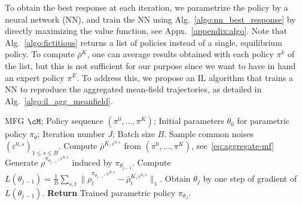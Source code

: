 \documentclass{article}
\theoremstyle{plain}
\begin{document}
To obtain the best response at each iteration, we parametrize the policy by a neural network (NN), and train the NN using Alg.~\ref{algo:nn_best_response} 
by directly maximizing the value function, see Appx.~\ref{appendix:algo}. Note that Alg.~\ref{algo:fictitious} returns a list of policies instead of a single, equilibrium policy. To compute $\bar\rho^K$, one can average results obtained with each policy $\pi^k$ of the list, but this is not sufficient for our purpose since we want to have in hand an expert policy $\pi^E$. 
To address this, we propose an IL algorithm that trains a NN to reproduce the aggregated mean-field trajectories, as detailed in Alg.~\ref{algo:il_agg_meanfield}.
\begin{algorithm}[t]
\caption{Mean Field Imitation Learning (MF-IL)}
\begin{algorithmic}[1]
\label{algo:il_agg_meanfield}
\REQUIRE MFG $\cM$; Policy sequence $(\pi^0, \dots, \pi^K)$; 
Initial parameters $\theta_0$ for parametric policy $\pi_\theta$; %
Iteration number $J$; Batch size $B$.
    \STATE Sample common noises $(\varepsilon^{0, s})_{1\leq s\leq B}$. %
        \STATE Compute $\bar{\rho}^{K,\varepsilon^{0, s}}$ from $(\pi^0, \dots, \pi^K)$, see~\eqref{eq:aggregate-mf}
        \STATE Generate $\rho^{\pi_{\theta_{j-1}},\varepsilon^{0, s}}$ induced by $\pi_{\theta_{j-1}}$.
    \ENDFOR
    \STATE Compute 
        $L(\theta_{j-1}) = \frac{1}{B} \sum_{s,t} \|\rho^{\pi_{\theta_{j-1}},\varepsilon^{0, s}}_t - \bar{\rho}^{K,\varepsilon^{0, s}}_t \|_1.$
    \STATE Obtain $\theta_j$ by one step of gradient of $L(\theta_{j-1})$.
\ENDFOR
\STATE \textbf{Return} Trained parametric policy $\pi_{\theta_J}$.
\end{algorithmic}
\end{algorithm}
\end{document}
